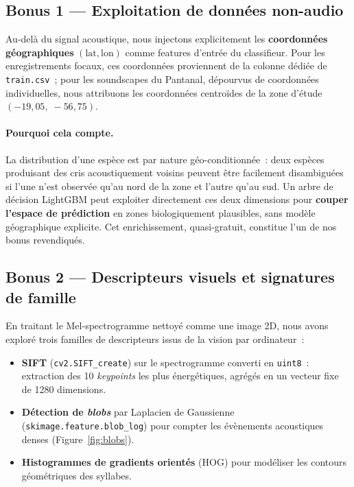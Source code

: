 \subsection{Bonus 1 — Exploitation de données non-audio}
\label{sec:bonus_geo}

Au-delà du signal acoustique, nous injectons explicitement les
\textbf{coordonnées géographiques} $(\text{lat}, \text{lon})$ comme
features d'entrée du classifieur. Pour les enregistrements focaux, ces
coordonnées proviennent de la colonne dédiée de \texttt{train.csv}~; pour
les soundscapes du Pantanal, dépourvus de coordonnées individuelles, nous
attribuons les coordonnées centroïdes de la zone d'étude
$(-19{,}05,\;-56{,}75)$.

\paragraph{Pourquoi cela compte.} La distribution d'une espèce est par
nature géo-conditionnée~: deux espèces produisant des cris acoustiquement
voisins peuvent être facilement disambiguées si l'une n'est observée
qu'au nord de la zone et l'autre qu'au sud. Un arbre de décision
LightGBM peut exploiter directement ces deux dimensions pour
\textbf{couper l'espace de prédiction} en zones biologiquement
plausibles, sans modèle géographique explicite. Cet enrichissement,
quasi-gratuit, constitue l'un de nos bonus revendiqués.

\subsection{Bonus 2 — Descripteurs visuels et signatures de famille}

En traitant le Mel-spectrogramme nettoyé comme une image 2D, nous avons
exploré trois familles de descripteurs issus de la vision par ordinateur~:
\begin{itemize}
    \item \textbf{SIFT} (\texttt{cv2.SIFT\_create}) sur le spectrogramme
          converti en \texttt{uint8}~: extraction des 10 \textit{keypoints} les
          plus énergétiques, agrégés en un vecteur fixe de 1280 dimensions.
    \item \textbf{Détection de \textit{blobs}} par Laplacien de Gaussienne
          (\texttt{skimage.feature.blob\_log}) pour compter les évènements
          acoustiques denses (Figure~\ref{fig:blobs}).
    \item \textbf{Histogrammes de gradients orientés} (HOG) pour modéliser
          les contours géométriques des syllabes.
\end{itemize}

